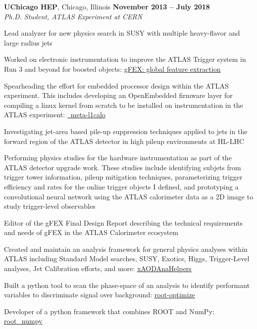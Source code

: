 \documentclass[margin,line]{resume}
\begin{document}
\begin{resume}
\textbf{UChicago HEP}, Chicago, Illinois \hfill \textbf{November 2013 -- July 2018}\\
\textsl{Ph.D. Student, ATLAS Experiment at CERN}
\begin{list2}
  \item Lead analyzer for new physics search in SUSY with multiple heavy-flavor and large radius jets \cite{SUSY-2016-10, SUSY-2015-10, ATLAS-CONF-2017-021, ATLAS-CONF-2016-052, ATLAS-CONF-2015-067}
  \item Worked on electronic instrumentation to improve the ATLAS Trigger system in Run 3 and beyond for boosted objects: \href{https://gfex.cern.ch/}{gFEX: global feature extraction} \cite{Tang:2104248, DPF2017gFEX}
  \item Spearheading the effort for embedded processor design within the ATLAS experiment. This includes developing an OpenEmbedded firmware layer for compiling a linux kernel from scratch to be installed on instrumentation in the ATLAS experiment: \href{https://github.com/kratsg/meta-l1calo}{~meta-l1calo}
  \item Investigating jet-area based pile-up suppression techniques applied to jets in the forward region of the ATLAS detector in high pileup environments at HL-LHC \cite{HFSF2017}
  \item Performing physics studies for the hardware instrumentation as part of the ATLAS detector upgrade work. These studies include identifying subjets from trigger tower information, pileup mitigation techniques, parameterizing trigger efficiency and rates for the online trigger objects I defined, and prototyping a convolutional neural network using the ATLAS calorimeter data as a 2D image to study trigger-level observables \cite{DPF2017gFEX}
  \item Editor of the gFEX Final Design Report describing the technical requirements and needs of gFEX in the ATLAS Calorimeter ecosystem \cite{Begel:2233958}
  \item Created and maintain an analysis framework for general physics analyses within ATLAS including Standard Model searches, SUSY, Exotics, Higgs, Trigger-Level analyses, Jet Calibration efforts, and more: \href{https://xaodanahelpers.readthedocs.io/en/master/}{xAODAnaHelpers} \cite{giordon_stark_2020_3743307}
  \item Built a python tool to scan the phase-space of an analysis to identify performant variables to discriminate signal over background: \href{https://github.com/kratsg/Optimization}{root-optimize}
  \item Developer of a python framework that combines ROOT and NumPy: \href{http://scikit-hep.org/root_numpy/}{root\_numpy} \cite{Noel_Dawe_2017}
\end{list2}


\end{resume}
\end{document}
